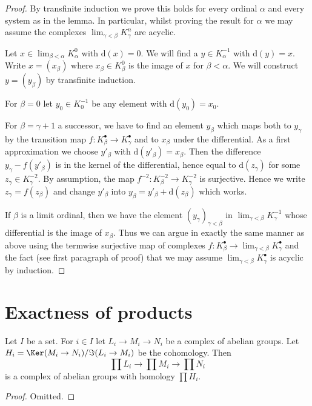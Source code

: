 \begin{proof}
By transfinite induction we prove this holds for every ordinal
$\alpha$ and every system as in the lemma. In particular, whilst
proving the result for $\alpha$ we may assume the complexes
$\lim_{\gamma < \beta} K^n_\gamma$ are acyclic.

\medskip\noindent
Let $x \in \lim_{\beta < \alpha} K^0_\alpha$ with $\text{d}(x) = 0$.
We will find a $y \in K^{-1}_\alpha$ with $\text{d}(y) = x$.
Write $x = (x_\beta)$ where $x_\beta \in K_\beta^0$ is the
image of $x$ for $\beta < \alpha$. We will construct $y = (y_\beta)$
by transfinite induction.

\medskip\noindent
For $\beta = 0$ let $y_0 \in K_0^{-1}$
be any element with $\text{d}(y_0) = x_0$.

\medskip\noindent
For $\beta = \gamma + 1$ a successor, we have to find an element $y_\beta$
which maps both to $y_\gamma$ by the transition map
$f : K^\bullet_\beta \to K^\bullet_\gamma$ and to $x_\beta$ under the
differential. As a first approximation we choose $y'_\beta$ with
$\text{d}(y'_\beta) = x_\beta$. Then the difference $y_\gamma - f(y'_\beta)$
is in the kernel of the differential, hence equal to $\text{d}(z_\gamma)$
for some $z_\gamma \in K^{-2}_\gamma$.
By assumption, the map $f^{-2} : K^{-2}_\beta \to K^{-2}_\gamma$
is surjective. Hence we write $z_\gamma = f(z_\beta)$
and change $y'_\beta$ into $y_\beta = y'_\beta + \text{d}(z_\beta)$
which works.

\medskip\noindent
If $\beta$ is a limit ordinal, then we have the element
$(y_\gamma)_{\gamma < \beta}$ in $\lim_{\gamma < \beta} K^{-1}_\gamma$
whose differential is the image of $x_\beta$. Thus we can argue in exactly
the same manner as above using the termwise surjective map of complexes
$f : K_\beta^\bullet \to \lim_{\gamma < \beta} K_\gamma^\bullet$
and the fact (see first paragraph of proof) that we may assume
$\lim_{\gamma < \beta} K_\gamma^\bullet$ is acyclic by induction.
\end{proof}


\section{Exactness of products}
\label{section-product-exact}


\begin{lemma}
\label{lemma-product-abelian-groups-exact}
Let $I$ be a set. For $i \in I$ let $L_i \to M_i \to N_i$ be a complex
of abelian groups. Let $H_i = \Ker(M_i \to N_i)/\Im(L_i \to M_i)$
be the cohomology. Then
$$
\prod L_i \to \prod M_i \to \prod N_i
$$
is a complex of abelian groups with homology $\prod H_i$.
\end{lemma}

\begin{proof}
Omitted.
\end{proof}












